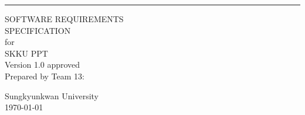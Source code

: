 \begin{flushright}
    \rule{16cm}{5pt}\vskip1cm
    \begin{bfseries}
        \Huge{SOFTWARE REQUIREMENTS\\ SPECIFICATION}\\
        \vspace{1.9cm}
        for\\
        \vspace{1.9cm}
        SKKU PPT\\
        \vspace{1.9cm}
        \large{Version 1.0 approved}\\
        \vspace{1.9cm}
        Prepared by Team 13:
        
        \vspace{1.9cm}
        Sungkyunkwan University\\
        \vspace{1.9cm}
        \today \\
    \end{bfseries}
\end{flushright}
\newpage